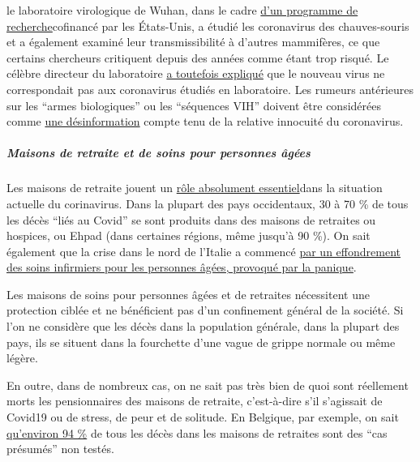 \begin{itemize}
  le laboratoire virologique de Wuhan, dans le cadre
  \href{https://www.newsweek.com/dr-fauci-backed-controversial-wuhan-lab-millions-us-dollars-risky-coronavirus-research-1500741}{d'un
  programme de recherche}cofinancé par les États-Unis, a étudié les
  coronavirus des chauves-souris et a également examiné leur
  transmissibilité à d'autres mammifères, ce que certains chercheurs
  critiquent depuis des années comme étant trop risqué. Le célèbre
  directeur du laboratoire
  \href{https://www.scientificamerican.com/article/how-chinas-bat-woman-hunted-down-viruses-from-sars-to-the-new-coronavirus1/}{a
  toutefois expliqué} que le nouveau virus ne correspondait pas aux
  coronavirus étudiés en laboratoire. Les rumeurs antérieures sur les
  ``armes biologiques'' ou les ``séquences VIH'' doivent être
  considérées comme
  \href{https://onlinelibrary.wiley.com/doi/full/10.1111/eci.13222}{une
  désinformation} compte tenu de la relative innocuité du coronavirus.
\end{itemize}

\hypertarget{maisons-de-retraite-et-de-soins-pour-personnes-uxe2guxe9es}{%
\subparagraph{\texorpdfstring{\textbf{Maisons de retraite et de soins
pour personnes
âgées}}{Maisons de retraite et de soins pour personnes âgées}}\label{maisons-de-retraite-et-de-soins-pour-personnes-uxe2guxe9es}}

Les maisons de retraite jouent un
\href{https://ltccovid.org/2020/04/12/mortality-associated-with-covid-19-outbreaks-in-care-homes-early-international-evidence/}{rôle
absolument essentiel}dans la situation actuelle du corinavirus. Dans la
plupart des pays occidentaux, 30 à 70 \% de tous les décès ``liés au
Covid'' se sont produits dans des maisons de retraites ou hospices, ou
Ehpad (dans certaines régions, même jusqu'à 90 \%). On sait également
que la crise dans le nord de l'Italie a commencé
\href{https://swprs.org/covid-19-a-report-from-italy/}{par un
effondrement des soins infirmiers pour les personnes âgées, provoqué par
la panique}.

Les maisons de soins pour personnes âgées et de retraites nécessitent
une protection ciblée et ne bénéficient pas d'un confinement général de
la société. Si l'on ne considère que les décès dans la population
générale, dans la plupart des pays, ils se situent dans la fourchette
d'une vague de grippe normale ou même légère.

En outre, dans de nombreux cas, on ne sait pas très bien de quoi sont
réellement morts les pensionnaires des maisons de retraite, c'est-à-dire
s'il s'agissait de Covid19 ou de stress, de peur et de solitude. En
Belgique, par exemple, on sait
\href{https://covid-19.sciensano.be/sites/default/files/Covid19/Meest\%20recente\%20update.pdf}{qu'environ
94 \%} de tous les décès dans les maisons de retraites sont des ``cas
présumés'' non testés.

